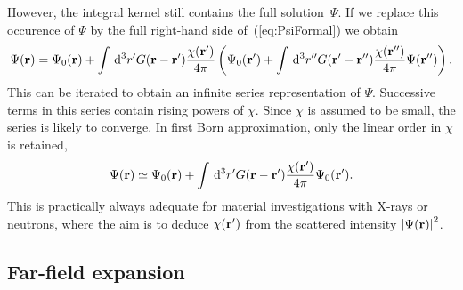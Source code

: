 However, the integral kernel still contains the full solution~$\Psi$.
If we replace this occurence of $\Psi$
by the full right-hand side of~(\ref{eq:PsiFormal})
we obtain
\begin{equation}
  \Psi(\mathbf{r})
  = \Psi_0(\mathbf{r})
  + \int\,{\rm d}^3r' G(\mathbf{r}-\mathbf{r'})\frac{\chi(\mathbf{r'})}{4\pi}
  \left(\Psi_0(\mathbf{r'})
  + \int\,{\rm d}^3r''
  G(\mathbf{r'}-\mathbf{r''})\frac{\chi(\mathbf{r''})}{4\pi}
  \Psi(\mathbf{r''})\right).
\end{equation}
This can be iterated to obtain an infinite series representation of $\Psi$.
Successive terms in this series contain rising powers of $\chi$.
Since $\chi$ is assumed to be small, the series is likely to converge.
In first Born approximation,
only the linear order in $\chi$ is retained,
\begin{equation}\label{eq:Born}
  \Psi(\mathbf{r})
  \simeq \Psi_0(\mathbf{r})
  + \int\,{\rm d}^3r' G(\mathbf{r}-\mathbf{r'})\frac{\chi(\mathbf{r'})}{4\pi}
   \Psi_0(\mathbf{r'}).
\end{equation}
This is practically always adequate for
material investigations with X-rays or neutrons,
where the aim is to 
deduce $\chi(\mathbf{r'})$ from the scattered intensity ${|\Psi(\mathbf{r})|}^2$.

\subsection{Far-field expansion}

